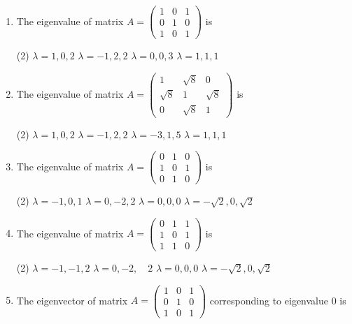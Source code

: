 \begin{enumerate}
\begin{tasks}
\end{tasks}                
 \item  The eigenvalue of matrix $A=\left(\begin{array}{lll}1 & 0 & 1 \\ 0 & 1 & 0 \\ 1 & 0 & 1\end{array}\right)$ is         
  \begin{tasks}(2)
 	\task[\textbf{a.}]$\lambda=1,0,2$
 	\task[\textbf{b.}]$\lambda=-1,2,2$
 	\task[\textbf{c.}]$\lambda=0,0,3$
 	\task[\textbf{d.}]$\lambda=1,1,1$ 
 \end{tasks}
 \item The eigenvalue of matrix $A=\left(\begin{array}{ccc}1 & \sqrt{8} & 0 \\ \sqrt{8} & 1 & \sqrt{8} \\ 0 & \sqrt{8} & 1\end{array}\right)$ is
  \begin{tasks}(2)
 	\task[\textbf{a.}]$\lambda=1,0,2$
 	\task[\textbf{b.}]$\lambda=-1,2,2$
 	\task[\textbf{c.}]$\lambda=-3,1,5$
 	\task[\textbf{d.}] $\lambda=1,1,1$
 \end{tasks}
 \item The eigenvalue of matrix $A=\left(\begin{array}{lll}0 & 1 & 0 \\ 1 & 0 & 1 \\ 0 & 1 & 0\end{array}\right)$ is
  \begin{tasks}(2)
 	\task[\textbf{a.}] $\lambda=-1,0,1$
 	\task[\textbf{b.}] $\lambda=0,-2,2$
 	\task[\textbf{c.}]$\lambda=0,0,0$
 	\task[\textbf{d.}]  $\lambda=-\sqrt{2}, 0, \sqrt{2}$
 \end{tasks}
\item The eigenvalue of matrix $A=\left(\begin{array}{lll}0 & 1 & 1 \\ 1 & 0 & 1 \\ 1 & 1 & 0\end{array}\right)$ is
  \begin{tasks}(2)
 	\task[\textbf{a.}]$\lambda=-1,-1,2$
 	\task[\textbf{b.}]$\lambda=0,-2, \quad 2$
 	\task[\textbf{c.}]$\lambda=0,0,0$
 	\task[\textbf{d.}]  $\lambda=-\sqrt{2}, 0, \sqrt{2}$
 \end{tasks}
\item The eigenvector of matrix $A=\left(\begin{array}{lll}1 & 0 & 1 \\ 0 & 1 & 0 \\ 1 & 0 & 1\end{array}\right)$ corresponding to eigenvalue 0 is

\end{enumerate}
